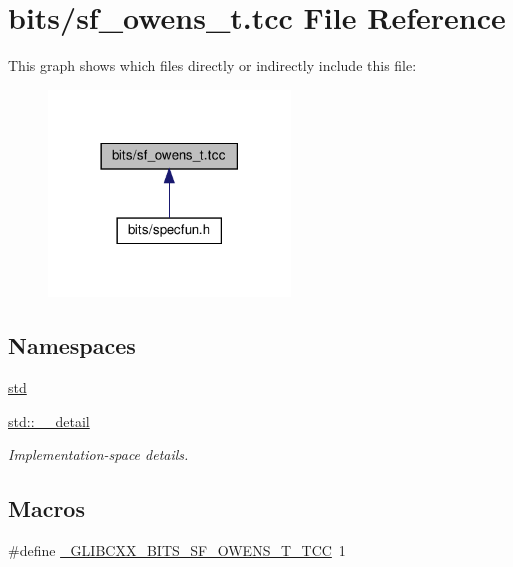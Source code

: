 \hypertarget{sf__owens__t_8tcc}{}\section{bits/sf\+\_\+owens\+\_\+t.tcc File Reference}
\label{sf__owens__t_8tcc}
This graph shows which files directly or indirectly include this file\+:
\nopagebreak
\begin{figure}[H]
\begin{center}
\leavevmode
\includegraphics[width=182pt]{sf__owens__t_8tcc__dep__incl}
\end{center}
\end{figure}
\subsection*{Namespaces}
\begin{DoxyCompactItemize}
\item 
 \hyperlink{namespacestd}{std}
\item 
 \hyperlink{namespacestd_1_1____detail}{std\+::\+\_\+\+\_\+detail}
\begin{DoxyCompactList}\small\item\em Implementation-\/space details. \end{DoxyCompactList}\end{DoxyCompactItemize}
\subsection*{Macros}
\begin{DoxyCompactItemize}
\item 
\#define \hyperlink{sf__owens__t_8tcc_a5986cbb2c459a5e859ffe2fe1fa7cd25}{\+\_\+\+G\+L\+I\+B\+C\+X\+X\+\_\+\+B\+I\+T\+S\+\_\+\+S\+F\+\_\+\+O\+W\+E\+N\+S\+\_\+\+T\+\_\+\+T\+CC}~1
\end{DoxyCompactItemize}
